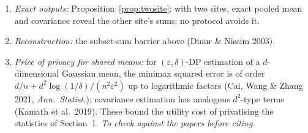 \documentclass[11pt]{article}
\theoremstyle{remark}
\begin{document}
\begin{enumerate}
\item \emph{Exact outputs:} Proposition~\ref{prop:twosite}: with two sites, exact pooled mean
  and covariance reveal the other site's sums; no protocol avoids it.
\item \emph{Reconstruction:} the subset-sum barrier above (Dinur \& Nissim 2003).
\item \emph{Price of privacy for shared means:} for $(\varepsilon,\delta)$-DP estimation of a
  $d$-dimensional Gaussian mean, the minimax squared error is of order
  $d/n+d^2\log(1/\delta)/(n^2\varepsilon^2)$ up to logarithmic factors (Cai, Wang \& Zhang 2021,
  \emph{Ann.\ Statist.}); covariance estimation has analogous $d^2$-type terms (Kamath et
  al.\ 2019). These bound the utility cost of privatising the statistics of
  Section~1. \emph{To check against the papers before citing.}
\end{enumerate}
\end{document}
